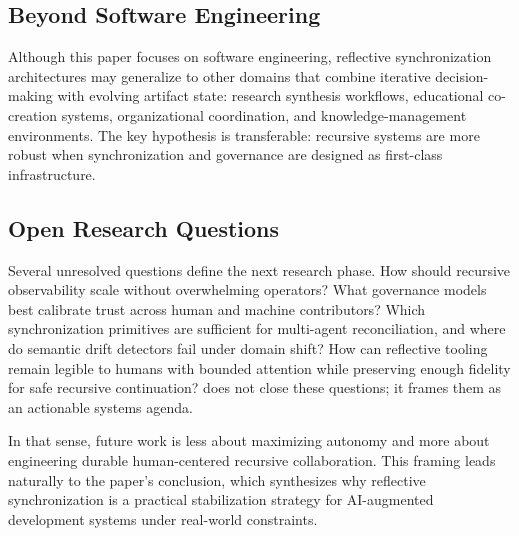\subsection{Beyond Software Engineering}

Although this paper focuses on software engineering, reflective synchronization architectures may generalize to other domains that combine iterative decision-making with evolving artifact state: research synthesis workflows, educational co-creation systems, organizational coordination, and knowledge-management environments. The key hypothesis is transferable: recursive systems are more robust when synchronization and governance are designed as first-class infrastructure.

\subsection{Open Research Questions}

Several unresolved questions define the next research phase. How should recursive observability scale without overwhelming operators? What governance models best calibrate trust across human and machine contributors? Which synchronization primitives are sufficient for multi-agent reconciliation, and where do semantic drift detectors fail under domain shift? How can reflective tooling remain legible to humans with bounded attention while preserving enough fidelity for safe recursive continuation?  does not close these questions; it frames them as an actionable systems agenda.

In that sense, future work is less about maximizing autonomy and more about engineering durable human-centered recursive collaboration. This framing leads naturally to the paper's conclusion, which synthesizes why reflective synchronization is a practical stabilization strategy for AI-augmented development systems under real-world constraints.
